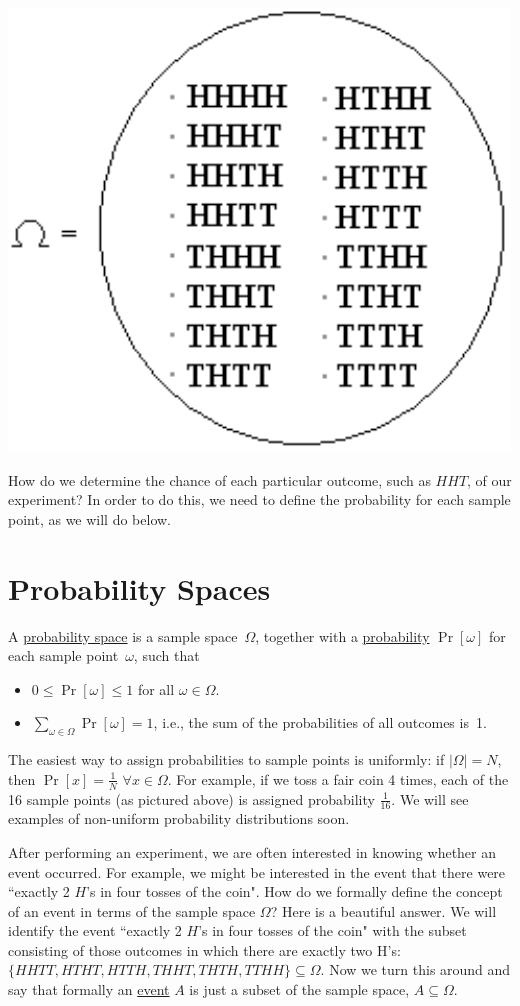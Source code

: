 \documentclass[11pt,fleqn]{article}
\begin{document}
\includegraphics[bb = -80 0 0 218, scale = 0.7]{samplespace}

How do we determine the chance of each particular outcome, such as $HHT$, of our experiment?
In order to do this,
we need to define the probability for each sample point, as we will do below. 

\section*{Probability Spaces}


A \underline{probability space} is a sample space~$\Omega$, together with
a \underline{probability} $\Pr[\omega]$ for each sample point~$\omega$, such
that
\begin{itemize}
\item $0\le\Pr[\omega]\le 1$ for all $\omega\in\Omega$.
\item $\displaystyle\sum_{\omega\in\Omega}\Pr[\omega] = 1$, i.e., the sum of
the probabilities of all outcomes is~1.
\end{itemize}

The easiest way to assign probabilities to sample points is
uniformly: if $|\Omega| = N$,
then $\Pr[x] = \frac{1}{N}$ $\forall x \in \Omega$. 
For example, if we toss a fair coin 4 times,
each of the 16 sample points (as pictured above) is assigned
probability $\frac{1}{16}$. We will see examples of non-uniform
probability distributions soon.

After performing an experiment, we are often
interested in knowing whether an event occurred. 
For example, we might be interested in the event that there were
``exactly 2 $H$'s in four tosses of the coin". How do we formally define
the concept of an event in terms of the sample space $\Omega$?
Here is a beautiful answer. We will identify the event ``exactly 2 $H$'s in four tosses of the coin"
with the subset consisting of those outcomes in which there are exactly two H's: \\
$\{HHTT, HTHT, HTTH, THHT, THTH, TTHH\} \subseteq \Omega$.
Now we turn this around and say that formally an \underline{event} $A$ is just a subset of the sample space,
$A \subseteq \Omega$. 
\end{document}
